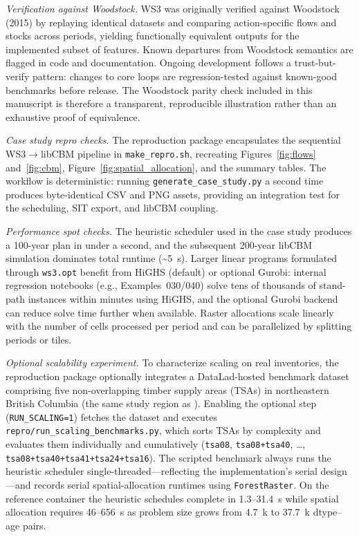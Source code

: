 \documentclass[review]{elsarticle}
\begin{document}
\emph{Verification against Woodstock.} WS3 was originally verified against Woodstock (2015) by replaying identical datasets and comparing action-specific flows and stocks across periods, yielding functionally equivalent outputs for the implemented subset of features. Known departures from Woodstock semantics are flagged in code and documentation. Ongoing development follows a trust-but-verify pattern: changes to core loops are regression-tested against known-good benchmarks before release. The Woodstock parity check included in this manuscript is therefore a transparent, reproducible illustration rather than an exhaustive proof of equivalence.

\emph{Case study repro checks.} The reproduction package encapsulates the sequential WS3$\to$libCBM pipeline in \texttt{make\_repro.sh}, recreating Figures~\ref{fig:flows} and~\ref{fig:cbm}, Figure~\ref{fig:spatial_allocation}, and the summary tables. The workflow is deterministic: running \texttt{generate\_case\_study.py} a second time produces byte-identical CSV and PNG assets, providing an integration test for the scheduling, SIT export, and libCBM coupling.

\emph{Performance spot checks.} The heuristic scheduler used in the case study produces a 100-year plan in under a second, and the subsequent 200-year libCBM simulation dominates total runtime (\textasciitilde5~s). Larger linear programs formulated through \texttt{ws3.opt} benefit from HiGHS (default) or optional Gurobi: internal regression notebooks (e.g., Examples~030/040) solve tens of thousands of stand-path instances within minutes using HiGHS, and the optional Gurobi backend can reduce solve time further when available. Raster allocations scale linearly with the number of cells processed per period and can be parallelized by splitting periods or tiles.

\emph{Optional scalability experiment.} To characterize scaling on real inventories, the reproduction package optionally integrates a DataLad-hosted benchmark dataset comprising five non-overlapping timber supply areas (TSAs) in northeastern British Columbia (the same study region as \citealt{boisvenue2022managing}). Enabling the optional step (\texttt{RUN\_SCALING=1}) fetches the dataset and executes \texttt{repro/run\_scaling\_benchmarks.py}, which sorts TSAs by complexity and evaluates them individually and cumulatively (\texttt{tsa08}, \texttt{tsa08+tsa40}, \ldots, \texttt{tsa08+tsa40+tsa41+tsa24+tsa16}). The scripted benchmark always runs the heuristic scheduler single-threaded---reflecting the implementation's serial design---and records serial spatial-allocation runtimes using \texttt{ForestRaster}. On the reference container the heuristic schedules complete in 1.3--31.4~s while spatial allocation requires 46--656~s as problem size grows from 4.7~k to 37.7~k dtype--age pairs.
\end{document}
